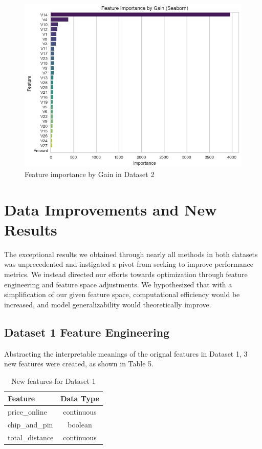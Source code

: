 \documentclass{article}
\begin{document}
\begin{figure}[htbp]
\centering
\includegraphics[width=\linewidth]{image/v14_gain_graph.png} %
\caption{Feature importance by Gain in Dataset 2}
\label{fig:my_photo} %
\end{figure}


\section{Data Improvements and New Results}

The exceptional results we obtained through nearly all methods in both datasets was unprecedented and instigated a pivot from seeking to improve performance metrics. We instead directed our efforts towards optimization through feature engineering and feature space adjustments. We hypothesized that with a simplification of our given feature space, computational efficiency would be increased, and model generalizability would theoretically improve. 

\subsection {Dataset 1 Feature Engineering}

Abstracting the interpretable meanings of the orignal features in Dataset 1, 3 new features were created, as shown in Table 5. 

\begin{table}[ht]
\centering

\label{tab:features}
\begin{tabular}{lc}
\toprule
Feature & Data Type \\
\midrule
price\_online & continuous \\
chip\_and\_pin & boolean \\
total\_distance & continuous \\
\bottomrule
\end{tabular}
\caption{New features for Dataset 1}
\end{table}
\end{document}
